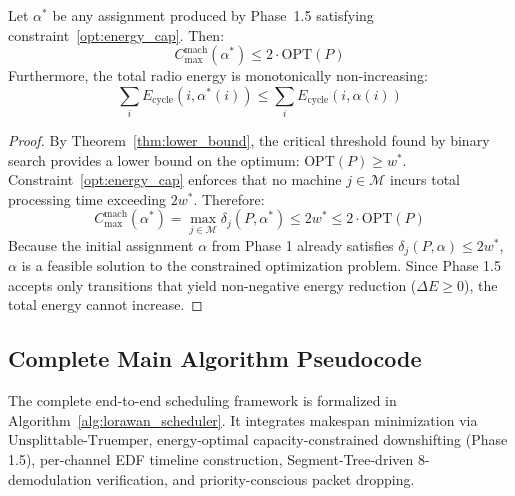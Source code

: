 \documentclass{article}
\begin{document}
\begin{theorem}
\label{thm:energy_preserves_bound}
Let $\alpha^*$ be any assignment produced by Phase~1.5 satisfying constraint~\eqref{opt:energy_cap}. Then:
\begin{equation}
C_{\max}^{\text{mach}}(\alpha^*) \le 2 \cdot \text{OPT}(P)
\end{equation}
Furthermore, the total radio energy is monotonically non-increasing:
\begin{equation}
\sum_{i} E_{\text{cycle}}(i, \alpha^*(i)) \le \sum_{i} E_{\text{cycle}}(i, \alpha(i))
\end{equation}
\end{theorem}
\begin{proof}
By Theorem~\ref{thm:lower_bound}, the critical threshold found by binary search provides a lower bound on the optimum: $\text{OPT}(P) \ge w^*$. Constraint~\eqref{opt:energy_cap} enforces that no machine $j \in \mathcal{M}$ incurs total processing time exceeding $2 w^*$. Therefore:
\begin{equation}
C_{\max}^{\text{mach}}(\alpha^*) = \max_{j \in \mathcal{M}} \delta_j(P, \alpha^*) \le 2 w^* \le 2 \cdot \text{OPT}(P)
\end{equation}
Because the initial assignment $\alpha$ from Phase 1 already satisfies $\delta_j(P, \alpha) \le 2 w^*$, $\alpha$ is a feasible solution to the constrained optimization problem. Since Phase 1.5 accepts only transitions that yield non-negative energy reduction ($\Delta E \ge 0$), the total energy cannot increase.
\end{proof}

\subsection{Complete Main Algorithm Pseudocode}
\label{subsec:main_algorithm}
The complete end-to-end scheduling framework is formalized in Algorithm~\ref{alg:lorawan_scheduler}. It integrates makespan minimization via $\text{Unsplittable-Truemper}$, energy-optimal capacity-constrained downshifting (Phase 1.5), per-channel EDF timeline construction, Segment-Tree-driven 8-demodulation verification, and priority-conscious packet dropping.
\end{document}

